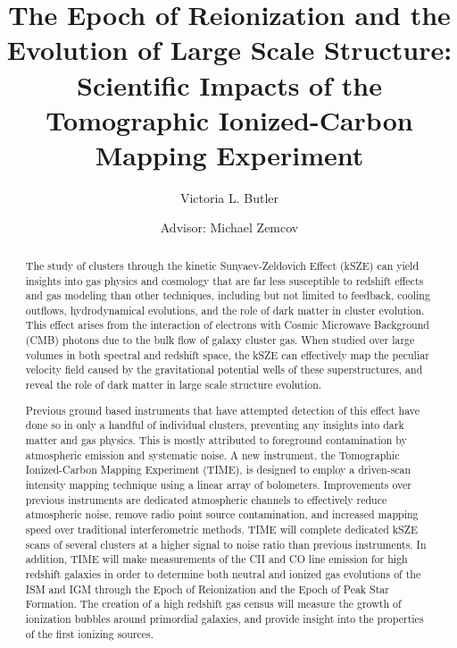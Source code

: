 \documentclass[manuscript]{aastex}
\begin{document}
\renewcommand{\thepage}{\roman{page}}
\title{The Epoch of Reionization and the Evolution of Large Scale Structure: Scientific Impacts of the Tomographic Ionized-Carbon Mapping Experiment}
\author{Victoria L. Butler}
\author{Advisor: Michael Zemcov}

\begin{abstract}
The study of clusters through the kinetic Sunyaev-Zeldovich Effect (kSZE) can yield insights into gas physics and cosmology that are far less susceptible to redshift effects and gas modeling than other techniques, including but not limited to feedback, cooling outflows, hydrodynamical evolutions, and the role of dark matter in cluster evolution. This effect arises from the interaction of electrons with Cosmic Microwave Background (CMB) photons due to the bulk flow of galaxy cluster gas. When studied over large volumes in both spectral and redshift space, the kSZE can effectively map the peculiar velocity field caused by the gravitational potential wells of these superstructures, and reveal the role of dark matter in large scale structure evolution. 

Previous ground based instruments that have attempted detection of this effect have done so in only a handful of individual clusters, preventing any insights into dark matter and gas physics. This is mostly attributed to foreground contamination by atmospheric emission and systematic noise. A new instrument, the Tomographic Ionized-Carbon Mapping Experiment (TIME), is designed to employ a driven-scan intensity mapping technique using a linear array of bolometers. Improvements over previous instruments are dedicated atmospheric channels to effectively reduce atmospheric noise, remove radio point source contamination, and increased mapping speed over traditional interferometric methods. TIME will complete dedicated kSZE scans of several clusters at a higher signal to noise ratio than previous instruments. In addition, TIME will make measurements of the CII and CO line emission for high redshift galaxies in order to determine both neutral and ionized gas evolutions of the ISM and IGM through the Epoch of Reionization and the Epoch of Peak Star Formation. The creation of a high redshift gas census will measure the growth of ionization bubbles around primordial galaxies, and provide insight into the properties of the first ionizing sources.
\end{abstract}
\end{document}
